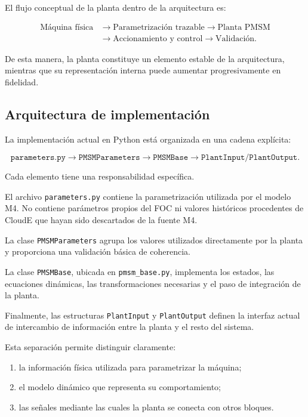 El flujo conceptual de la planta dentro de la arquitectura es:

\begin{equation}
\begin{aligned}
\text{Máquina física}
&\rightarrow \text{Parametrización trazable}
\rightarrow \text{Planta PMSM}
\\
&\rightarrow \text{Accionamiento y control}
\rightarrow \text{Validación}.
\end{aligned}
\end{equation}

De esta manera, la planta constituye un elemento estable de la arquitectura, mientras que su representación interna puede aumentar progresivamente en fidelidad.

\subsection{Arquitectura de implementación}

La implementación actual en Python está organizada en una cadena explícita:

\begin{equation}
\texttt{parameters.py}
\rightarrow
\texttt{PMSMParameters}
\rightarrow
\texttt{PMSMBase}
\rightarrow
\texttt{PlantInput/PlantOutput}.
\end{equation}

Cada elemento tiene una responsabilidad específica.

El archivo \texttt{parameters.py} contiene la parametrización utilizada por el modelo M4. No contiene parámetros propios del FOC ni valores históricos procedentes de CloudE que hayan sido descartados de la fuente M4.

La clase \texttt{PMSMParameters} agrupa los valores utilizados directamente por la planta y proporciona una validación básica de coherencia.

La clase \texttt{PMSMBase}, ubicada en \texttt{pmsm\_base.py}, implementa los estados, las ecuaciones dinámicas, las transformaciones necesarias y el paso de integración de la planta.

Finalmente, las estructuras \texttt{PlantInput} y \texttt{PlantOutput} definen la interfaz actual de intercambio de información entre la planta y el resto del sistema.

Esta separación permite distinguir claramente:

\begin{enumerate}
\item la información física utilizada para parametrizar la máquina;
\item el modelo dinámico que representa su comportamiento;
\item las señales mediante las cuales la planta se conecta con otros bloques.
\end{enumerate}

